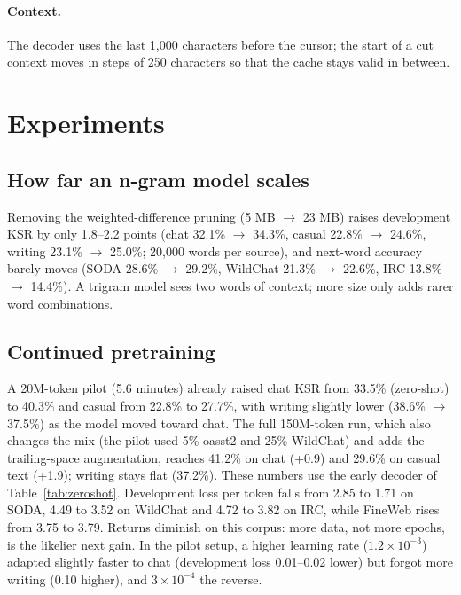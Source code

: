 \documentclass[11pt]{article}
\begin{document}
\paragraph{Context.} The decoder uses the last 1,000 characters before the cursor; the start of a cut context moves
in steps of 250 characters so that the cache stays valid in between.

\section{Experiments}
\label{sec:experiments}

\subsection{How far an n-gram model scales}

Removing the weighted-difference pruning (5 MB $\to$ 23 MB) raises development KSR by only 1.8--2.2 points (chat
32.1\% $\to$ 34.3\%, casual 22.8\% $\to$ 24.6\%, writing 23.1\% $\to$ 25.0\%; 20,000 words per source), and next-word
accuracy barely moves (SODA 28.6\% $\to$ 29.2\%, WildChat 21.3\% $\to$ 22.6\%, IRC 13.8\% $\to$ 14.4\%). A trigram
model sees two words of context; more size only adds rarer word combinations.

\subsection{Continued pretraining}

A 20M-token pilot (5.6 minutes) already raised chat KSR from 33.5\% (zero-shot) to 40.3\% and casual from 22.8\% to
27.7\%, with writing slightly lower (38.6\% $\to$ 37.5\%) as the model moved toward chat. The full 150M-token run,
which also changes the mix (the pilot used 5\% oasst2 and 25\% WildChat) and adds the trailing-space augmentation,
reaches 41.2\% on chat (+0.9) and 29.6\% on casual text (+1.9); writing stays flat (37.2\%). These numbers use the
early decoder of Table~\ref{tab:zeroshot}. Development loss per token falls from 2.85 to 1.71 on SODA, 4.49 to 3.52
on WildChat and 4.72 to 3.82 on IRC, while FineWeb rises from 3.75 to 3.79. Returns diminish on this corpus: more
data, not more epochs, is the likelier next gain. In the pilot setup, a higher learning rate ($1.2\times10^{-3}$)
adapted slightly faster to chat (development loss 0.01--0.02 lower) but forgot more writing (0.10 higher), and
$3\times10^{-4}$ the reverse.
\end{document}
